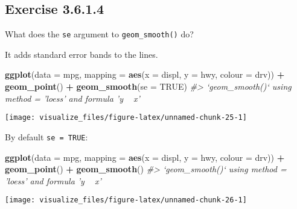 \documentclass[]{book}
\newenvironment{Shaded}{\begin{snugshade}}{\end{snugshade}}
\newcommand{\CommentTok}[1]{\textcolor[rgb]{0.56,0.35,0.01}{\textit{#1}}}
\newcommand{\DataTypeTok}[1]{\textcolor[rgb]{0.13,0.29,0.53}{#1}}
\newcommand{\KeywordTok}[1]{\textcolor[rgb]{0.13,0.29,0.53}{\textbf{#1}}}
\newcommand{\NormalTok}[1]{#1}
\newcommand{\OperatorTok}[1]{\textcolor[rgb]{0.81,0.36,0.00}{\textbf{#1}}}
\newcommand{\OtherTok}[1]{\textcolor[rgb]{0.56,0.35,0.01}{#1}}
\newcommand{\StringTok}[1]{\textcolor[rgb]{0.31,0.60,0.02}{#1}}
\theoremstyle{plain}
\theoremstyle{remark}
\begin{document}
\hypertarget{exercise-3.6.1.4}{%
\subsection*{\texorpdfstring{Exercise
{3.6.1.4}}{Exercise 3.6.1.4}}\label{exercise-3.6.1.4}}

What does the \texttt{se} argument to \texttt{geom\_smooth()} do?

It adds standard error bands to the lines.

\begin{Shaded}
\begin{Highlighting}[]
\KeywordTok{ggplot}\NormalTok{(}\DataTypeTok{data =}\NormalTok{ mpg, }\DataTypeTok{mapping =} \KeywordTok{aes}\NormalTok{(}\DataTypeTok{x =}\NormalTok{ displ, }\DataTypeTok{y =}\NormalTok{ hwy, }\DataTypeTok{colour =}\NormalTok{ drv)) }\OperatorTok{+}
\StringTok{  }\KeywordTok{geom_point}\NormalTok{() }\OperatorTok{+}
\StringTok{  }\KeywordTok{geom_smooth}\NormalTok{(}\DataTypeTok{se =} \OtherTok{TRUE}\NormalTok{)}
\CommentTok{#> `geom_smooth()` using method = 'loess' and formula 'y ~ x'}
\end{Highlighting}
\end{Shaded}

\begin{center}\texttt{[image: visualize\_files/figure-latex/unnamed-chunk-25-1]} \end{center}

By default \texttt{se\ =\ TRUE}:

\begin{Shaded}
\begin{Highlighting}[]
\KeywordTok{ggplot}\NormalTok{(}\DataTypeTok{data =}\NormalTok{ mpg, }\DataTypeTok{mapping =} \KeywordTok{aes}\NormalTok{(}\DataTypeTok{x =}\NormalTok{ displ, }\DataTypeTok{y =}\NormalTok{ hwy, }\DataTypeTok{colour =}\NormalTok{ drv)) }\OperatorTok{+}
\StringTok{  }\KeywordTok{geom_point}\NormalTok{() }\OperatorTok{+}
\StringTok{  }\KeywordTok{geom_smooth}\NormalTok{()}
\CommentTok{#> `geom_smooth()` using method = 'loess' and formula 'y ~ x'}
\end{Highlighting}
\end{Shaded}

\begin{center}\texttt{[image: visualize\_files/figure-latex/unnamed-chunk-26-1]} \end{center}
\end{document}
